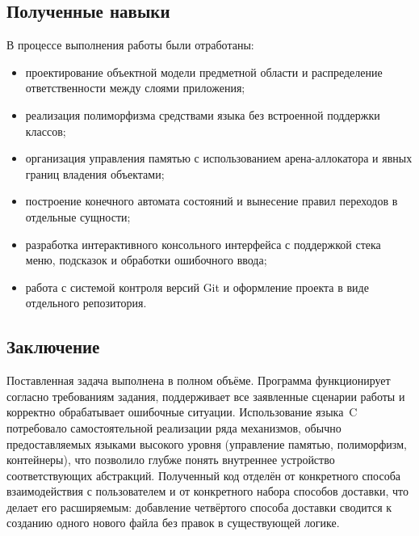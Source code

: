 \documentclass[12pt]{extarticle}
\begin{document}
\subsection*{Полученные навыки}

В процессе выполнения работы были отработаны:

\begin{itemize}
    \item проектирование объектной модели предметной области и
          распределение ответственности между слоями приложения;
    \item реализация полиморфизма средствами языка без
          встроенной поддержки классов;
    \item организация управления памятью с использованием
          арена-аллокатора и явных границ владения объектами;
    \item построение конечного автомата состояний и вынесение
          правил переходов в отдельные сущности;
    \item разработка интерактивного консольного интерфейса с
          поддержкой стека меню, подсказок и обработки ошибочного
          ввода;
    \item работа с системой контроля версий Git и оформление
          проекта в виде отдельного репозитория.
\end{itemize}

\subsection*{Заключение}

Поставленная задача выполнена в полном объёме. Программа
функционирует согласно требованиям задания, поддерживает все
заявленные сценарии работы и корректно обрабатывает ошибочные
ситуации. Использование языка~C потребовало самостоятельной
реализации ряда механизмов, обычно предоставляемых языками
высокого уровня (управление памятью, полиморфизм, контейнеры), что
позволило глубже понять внутреннее устройство соответствующих
абстракций. Полученный код отделён от конкретного способа
взаимодействия с пользователем и от конкретного набора способов
доставки, что делает его расширяемым: добавление четвёртого способа
доставки сводится к созданию одного нового файла без правок в
существующей логике.
\end{document}
